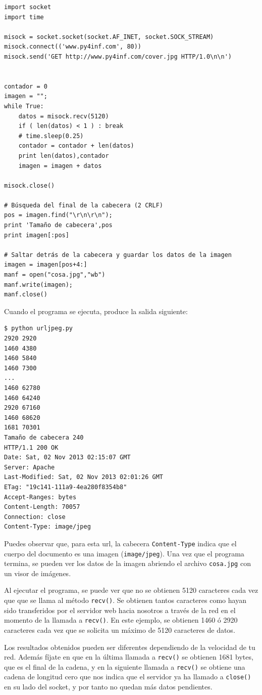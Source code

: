 \beforeverb
\begin{verbatim}
import socket
import time

misock = socket.socket(socket.AF_INET, socket.SOCK_STREAM)
misock.connect(('www.py4inf.com', 80))
misock.send('GET http://www.py4inf.com/cover.jpg HTTP/1.0\n\n')


contador = 0
imagen = "";
while True:
    datos = misock.recv(5120)
    if ( len(datos) < 1 ) : break
    # time.sleep(0.25)
    contador = contador + len(datos)
    print len(datos),contador
    imagen = imagen + datos

misock.close()

# Búsqueda del final de la cabecera (2 CRLF)
pos = imagen.find("\r\n\r\n");
print 'Tamaño de cabecera',pos
print imagen[:pos]

# Saltar detrás de la cabecera y guardar los datos de la imagen
imagen = imagen[pos+4:]
manf = open("cosa.jpg","wb")
manf.write(imagen);
manf.close()
\end{verbatim}
\afterverb
%
Cuando el programa se ejecuta, produce la salida siguiente:

\beforeverb
\begin{verbatim}
$ python urljpeg.py 
2920 2920
1460 4380
1460 5840
1460 7300
...
1460 62780
1460 64240
2920 67160
1460 68620
1681 70301
Tamaño de cabecera 240
HTTP/1.1 200 OK
Date: Sat, 02 Nov 2013 02:15:07 GMT
Server: Apache
Last-Modified: Sat, 02 Nov 2013 02:01:26 GMT
ETag: "19c141-111a9-4ea280f8354b8"
Accept-Ranges: bytes
Content-Length: 70057
Connection: close
Content-Type: image/jpeg
\end{verbatim}
\afterverb
%
Puedes observar que, para esta url, la
cabecera {\tt Content-Type} indica que el
cuerpo del documento es una imagen ({\tt image/jpeg}).
Una vez que el programa termina, se pueden ver los datos de la imagen abriendo
el archivo {\tt cosa.jpg} con un visor de imágenes.

Al ejecutar el programa, se puede ver que no se obtienen 5120 caracteres
cada vez que que se llama al método {\tt recv()}.
Se obtienen tantos caracteres como hayan sido transferidos por el servidor web hacia nosotros
a través de la red en el momento de la llamada a {\tt recv()}.
En este ejemplo, se obtienen 1460 ó 2920 caracteres cada vez que
se solicita un máximo de 5120 caracteres de datos.

Los resultados obtenidos pueden ser diferentes dependiendo de la velocidad de tu red. Además
fíjate en que en la última llamada a {\tt recv()} se obtienen 1681 bytes, que es el final
de la cadena, y en la siguiente llamada a {\tt recv()} se obtiene una cadena de
longitud cero que nos indica que el servidor ya ha llamado a {\tt close()} en su lado
del socket, y por tanto no quedan más datos pendientes.

